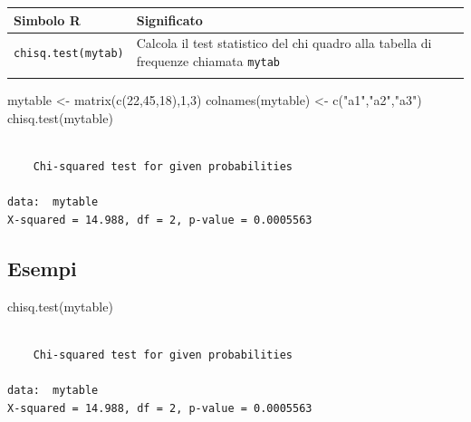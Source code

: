 \documentclass[
  ignorenonframetext,
  compress, aspectratio=149]{beamer}
\newenvironment{Shaded}{}{}
\newcommand{\DecValTok}[1]{\textcolor[rgb]{0.69,0.50,0.00}{#1}}
\newcommand{\FunctionTok}[1]{\textcolor[rgb]{0.39,0.29,0.61}{#1}}
\newcommand{\NormalTok}[1]{\textcolor[rgb]{0.12,0.11,0.11}{#1}}
\newcommand{\OtherTok}[1]{\textcolor[rgb]{0.00,0.43,0.16}{#1}}
\newcommand{\StringTok}[1]{\textcolor[rgb]{0.75,0.01,0.01}{#1}}
\begin{document}
\begin{frame}{}
\label{section-9}
\small

\begin{longtable}[]{@{}
  >{\raggedright\arraybackslash}p{}
  >{\raggedright\arraybackslash}p{}@{}}
\toprule\noalign{}
\begin{minipage}[b]{\linewidth}\raggedright
\textbf{Simbolo R}
\end{minipage} & \begin{minipage}[b]{\linewidth}\raggedright
\textbf{Significato}
\end{minipage} \\
\midrule\noalign{}
\endhead
\texttt{chisq.test(mytab)} & Calcola il test statistico del chi quadro
alla tabella di frequenze chiamata \texttt{mytab} \\
\bottomrule\noalign{}
\end{longtable}

\footnotezize

\begin{Shaded}
\begin{Highlighting}[]
\NormalTok{mytable }\OtherTok{\textless{}{-}} \FunctionTok{matrix}\NormalTok{(}\FunctionTok{c}\NormalTok{(}\DecValTok{22}\NormalTok{,}\DecValTok{45}\NormalTok{,}\DecValTok{18}\NormalTok{),}\DecValTok{1}\NormalTok{,}\DecValTok{3}\NormalTok{)}
\FunctionTok{colnames}\NormalTok{(mytable) }\OtherTok{\textless{}{-}} \FunctionTok{c}\NormalTok{(}\StringTok{"a1"}\NormalTok{,}\StringTok{"a2"}\NormalTok{,}\StringTok{"a3"}\NormalTok{)}
\FunctionTok{chisq.test}\NormalTok{(mytable)}
\end{Highlighting}
\end{Shaded}

\begin{verbatim}

    Chi-squared test for given probabilities

data:  mytable
X-squared = 14.988, df = 2, p-value = 0.0005563
\end{verbatim}
\end{frame}

\subsection{Esempi}\label{esempi-1}

\begin{frame}[fragile]{}
\label{section-10}
\begin{Shaded}
\begin{Highlighting}[]
\FunctionTok{chisq.test}\NormalTok{(mytable)}
\end{Highlighting}
\end{Shaded}

\begin{verbatim}

    Chi-squared test for given probabilities

data:  mytable
X-squared = 14.988, df = 2, p-value = 0.0005563
\end{verbatim}
\end{frame}
\end{document}
